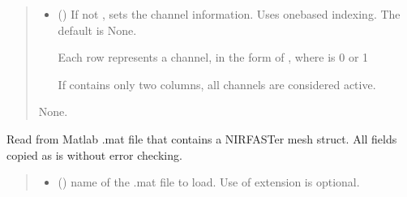 \documentclass[letterpaper,10pt,english]{sphinxmanual}
\begin{document}
\begin{fulllineitems}
\begin{fulllineitems}
\begin{quote}
\begin{description}
\begin{itemize}
\sphinxAtStartPar
See {\hyperref[\detokenize{_autosummary/nirfasterff.base.optodes.optode:nirfasterff.base.optodes.optode.touch_detectors}]{}} for details.


\item {} 
\sphinxAtStartPar
{} (\sphinxstyleliteralemphasis{\sphinxupquote{, }}) \textendash{} 
\sphinxAtStartPar
If not , sets the channel information. Uses one\sphinxhyphen{}based indexing. The default is None.

\sphinxAtStartPar
Each row represents a channel, in the form of , where  is 0 or 1

\sphinxAtStartPar
If  contains only two columns, all channels are considered active.


\end{itemize}

\sphinxAtStartPar
None.

\end{description}\end{quote}

\end{fulllineitems}


\begin{fulllineitems}
\label{\detokenize{_autosummary/nirfasterff.base.dcs_mesh.dcsmesh:nirfasterff.base.dcs_mesh.dcsmesh.from_mat}}
\pysigstartsignatures
\pysiglinewithargsret
{}
{\sphinxparamcomma {}}
{}
\pysigstopsignatures
\sphinxAtStartPar
Read from Matlab .mat file that contains a NIRFASTer mesh struct. All fields copied as is without error checking.
\begin{quote}\begin{description}
\begin{itemize}
\item {} 
\sphinxAtStartPar
{} () \textendash{} name of the .mat file to load. Use of extension is optional.


\end{itemize}
\end{description}
\end{quote}
\end{fulllineitems}
\end{fulllineitems}
\end{document}
